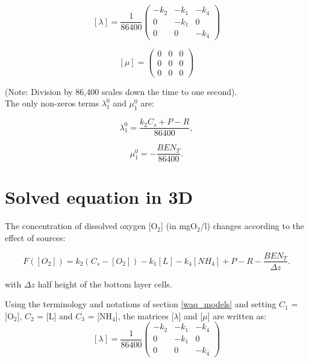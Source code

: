 $$  [\lambda] = \frac{1}{86400}
  \begin{pmatrix}
    -k_2 & -k_1  & -k_4 \\
     0   & -k_1  & 0    \\
     0   &  0    & -k_4
  \end{pmatrix}
$$

$$
  [\mu] =
  \begin{pmatrix}
     0  & 0 & 0 \\
     0  & 0 & 0 \\
     0  & 0 & 0
  \end{pmatrix}
$$

(Note: Division by 86,400 scales down the time to one second).\\

The only non-zeros terms $ \lambda_1^0$ and $ \mu_1^0$ are:

\begin{equation}
  \lambda_1^0 = \frac{k_2 C_s + P - R}{86400},
\end{equation}

\begin{equation}
  \mu_1^0 = -\frac{BEN_T}{86400}.
\end{equation}

\section{Solved equation in 3D}

The concentration of dissolved oxygen [O$_2$] (in mgO$_2$/l) changes
according to the effect of sources:

\begin{equation}
  F([O_2]) = k_2 (C_s - [O_2]) -k_1 [L] - k_4 [NH_4] + P - R  - \frac{BEN_T}{\Delta z}.
\end{equation}

with $\Delta z$ half height of the bottom layer cells.

Using the terminology and notations of section \ref{waq_models}
and setting $C_1$ = [O$_2$], $C_2$ = [L] and $C_3$ = [NH$_4$],
the matrices [$ \lambda $] and [$ \mu $]
are written as:\\

$$  [\lambda] = \frac{1}{86400}
  \begin{pmatrix}
    -k_2 & -k_1  & -k_4 \\
     0   & -k_1  & 0    \\
     0   &  0    & -k_4
  \end{pmatrix}
$$


